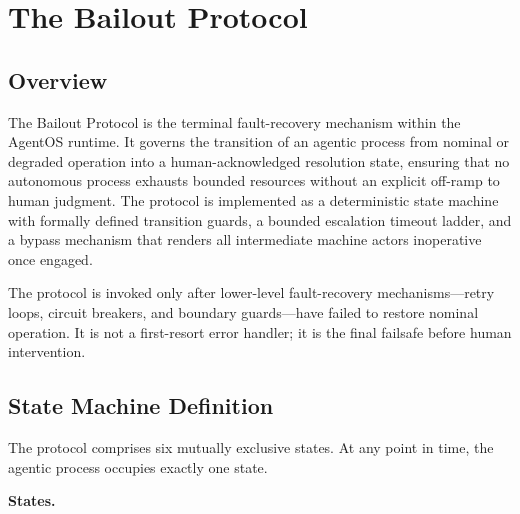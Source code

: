 \section{The Bailout Protocol}

\subsection{Overview}

The Bailout Protocol is the terminal fault-recovery mechanism within the AgentOS runtime. It governs the transition of an agentic process from nominal or degraded operation into a human-acknowledged resolution state, ensuring that no autonomous process exhausts bounded resources without an explicit off-ramp to human judgment. The protocol is implemented as a deterministic state machine with formally defined transition guards, a bounded escalation timeout ladder, and a bypass mechanism that renders all intermediate machine actors inoperative once engaged.

The protocol is invoked only after lower-level fault-recovery mechanisms—retry loops, circuit breakers, and boundary guards—have failed to restore nominal operation. It is not a first-resort error handler; it is the final failsafe before human intervention.

\subsection{State Machine Definition}

The protocol comprises six mutually exclusive states. At any point in time, the agentic process occupies exactly one state.

\bigskip

\noindent\textbf{States.}

